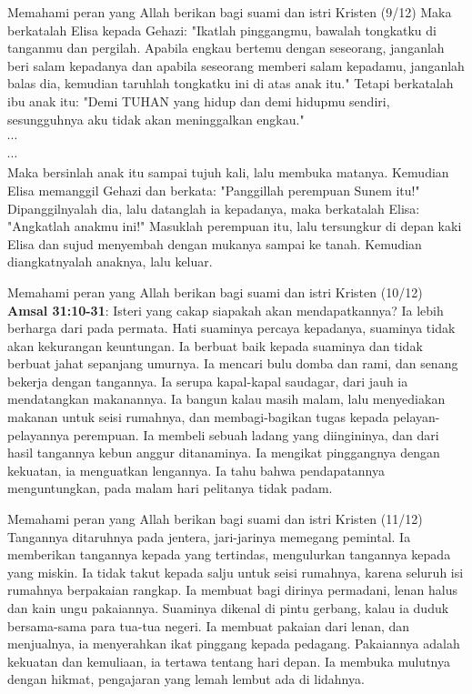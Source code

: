 \documentclass{beamer}
\theoremstyle{mystyle}
\begin{document}
\begin{frame}{Memahami peran yang Allah berikan bagi suami dan istri Kristen (9/12)}
Maka berkatalah Elisa kepada Gehazi: "Ikatlah pinggangmu, bawalah tongkatku di tanganmu dan pergilah. Apabila engkau bertemu dengan seseorang, janganlah beri salam kepadanya dan apabila seseorang memberi salam kepadamu, janganlah balas dia, kemudian taruhlah tongkatku ini di atas anak itu." Tetapi berkatalah ibu anak itu: "Demi TUHAN yang hidup dan demi hidupmu sendiri, sesungguhnya aku tidak akan meninggalkan engkau."	\\
	$\cdots$ \\
	$\cdots$ \\
 Maka bersinlah anak itu sampai tujuh kali, lalu membuka matanya. Kemudian Elisa memanggil Gehazi dan berkata: "Panggillah perempuan Sunem itu!" Dipanggilnyalah dia, lalu datanglah ia kepadanya, maka berkatalah Elisa: "Angkatlah anakmu ini!" Masuklah perempuan itu, lalu tersungkur di depan kaki Elisa dan sujud menyembah dengan mukanya sampai ke tanah. Kemudian diangkatnyalah anaknya, lalu keluar.				
\end{frame}

\begin{frame}{Memahami peran yang Allah berikan bagi suami dan istri Kristen (10/12)}
		\textbf{Amsal 31:10-31}: Isteri yang cakap siapakah akan mendapatkannya? Ia lebih berharga dari pada permata. Hati suaminya percaya kepadanya, suaminya tidak akan kekurangan keuntungan. Ia berbuat baik kepada suaminya dan tidak berbuat jahat sepanjang umurnya. Ia mencari bulu domba dan rami, dan senang bekerja dengan tangannya. Ia serupa kapal-kapal saudagar, dari jauh ia mendatangkan makanannya. Ia bangun kalau masih malam, lalu menyediakan makanan untuk seisi rumahnya, dan membagi-bagikan tugas kepada pelayan-pelayannya perempuan. Ia membeli sebuah ladang yang diingininya, dan dari hasil tangannya kebun anggur ditanaminya. Ia mengikat pinggangnya dengan kekuatan, ia menguatkan lengannya. Ia tahu bahwa pendapatannya menguntungkan, pada malam hari pelitanya tidak padam. 
\end{frame}

\begin{frame}{Memahami peran yang Allah berikan bagi suami dan istri Kristen (11/12)}
Tangannya ditaruhnya pada jentera, jari-jarinya memegang pemintal. Ia memberikan tangannya kepada yang tertindas, mengulurkan tangannya kepada yang miskin. Ia tidak takut kepada salju untuk seisi rumahnya, karena seluruh isi rumahnya berpakaian rangkap. Ia membuat bagi dirinya permadani, lenan halus dan kain ungu pakaiannya. Suaminya dikenal di pintu gerbang, kalau ia duduk bersama-sama para tua-tua negeri. Ia membuat pakaian dari lenan, dan menjualnya, ia menyerahkan ikat pinggang kepada pedagang. Pakaiannya adalah kekuatan dan kemuliaan, ia tertawa tentang hari depan. Ia membuka mulutnya dengan hikmat, pengajaran yang lemah lembut ada di lidahnya. 
\end{frame}
\end{document}
